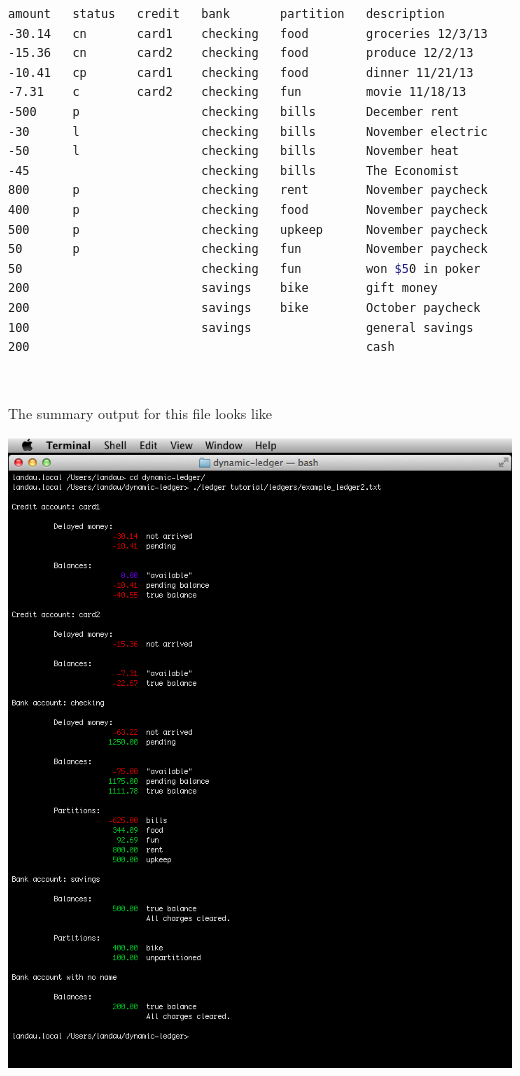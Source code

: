 \documentclass{article}
\providecommand{\q}{$\quad$ \newline}
\begin{document}
\begin{flushleft}
\begin{lstlisting}[language=bash, title = example\_ledger2.txt]
amount   status   credit   bank       partition   description
-30.14   cn       card1    checking   food        groceries 12/3/13
-15.36   cn       card2    checking   food        produce 12/2/13
-10.41   cp       card1    checking   food        dinner 11/21/13
-7.31    c        card2    checking   fun         movie 11/18/13
-500     p                 checking   bills       December rent
-30      l                 checking   bills       November electric
-50      l                 checking   bills       November heat
-45                        checking   bills       The Economist
800      p                 checking   rent        November paycheck		
400      p                 checking   food        November paycheck	
500      p                 checking   upkeep      November paycheck		
50       p                 checking   fun         November paycheck	
50                         checking   fun         won $50 in poker		
200                        savings    bike        gift money
200                        savings    bike        October paycheck
100                        savings                general savings
200                                               cash
\end{lstlisting}  \q

The summary output for this file looks like

\begin{center}
\includegraphics[scale=.5]{fig/sum1.png}
\end{center} \q




\end{flushleft}
\end{document}

